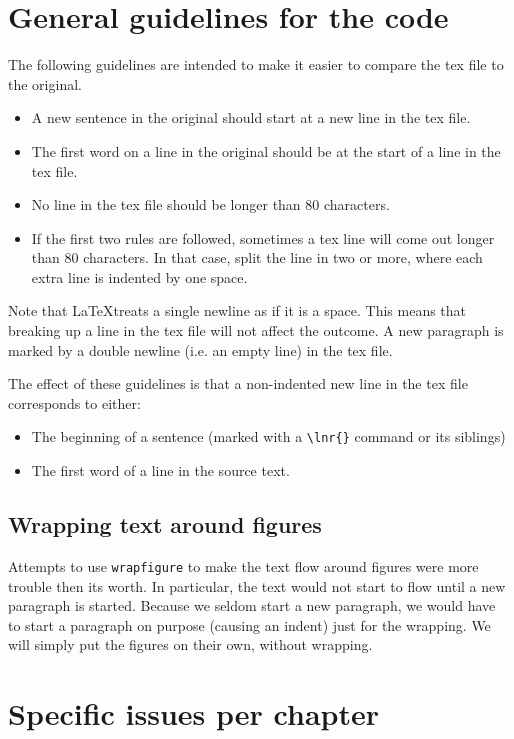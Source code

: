 \documentclass{report}
\begin{document}
\section{General guidelines for the \XeLaTeX code}
The following guidelines are intended to make it easier to compare the
tex file to the original.
\begin{itemize}
\item A new sentence in the original should start at a new line in the tex file.
\item The first word on a line in the original should be at the start of a line
in the tex file.
\item No line in the tex file should be longer than 80 characters.
\item If the first two rules are followed, sometimes a tex line will come out
longer than 80 characters. In that case, split the line in two or more,
where each extra line is indented by one space.
\end{itemize}
Note that \LaTeX treats a single newline as if it is a space. This means that
breaking up a line in the tex file will not affect the outcome.
A new paragraph is marked by a double newline (i.e. an empty line) in the
tex file.

The effect of these guidelines is that a non-indented new line
in the tex file corresponds
to either:
\begin{itemize}
\item The beginning of a sentence (marked with a \verb+\lnr{}+ command or
its siblings)
\item The first word of a line in the source text.
\end{itemize}

\subsection{Wrapping text around figures}
Attempts to use \verb+wrapfigure+ to make the text flow around figures were
more trouble then its worth. In particular, the text would not start to
flow until a new paragraph is started. Because we seldom start a new paragraph,
we would have to start a paragraph on purpose (causing an indent) just for the
wrapping. We will simply put the figures on their own, without wrapping.

\section{Specific issues per chapter}
\end{document}
